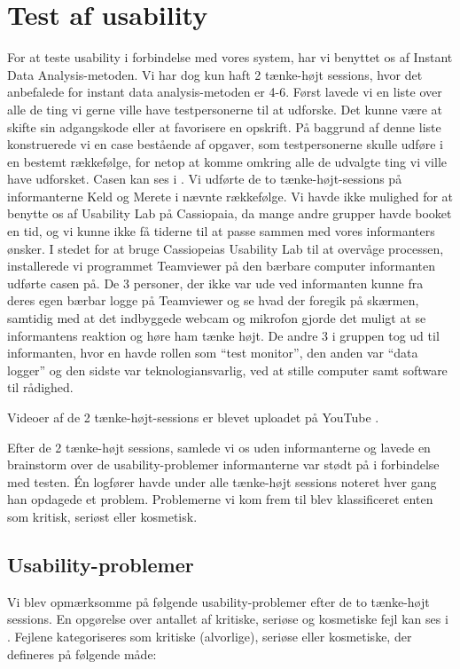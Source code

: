 \section{Test af usability}
\label{sec:usability}

For at teste usability i forbindelse med vores system, har vi benyttet os af Instant Data Analysis-metoden\cite{debida}. Vi har dog kun haft 2 tænke-højt sessions, hvor det anbefalede for instant data analysis-metoden er 4-6. Først lavede vi en liste over alle de ting vi gerne ville have testpersonerne til at udforske. Det kunne \fx være at skifte sin adgangskode eller at favorisere en opskrift. På baggrund af denne liste konstruerede vi en case bestående af opgaver, som testpersonerne skulle udføre i en bestemt rækkefølge, for netop at komme omkring alle de udvalgte ting vi ville have udforsket. Casen kan ses i . Vi udførte de to tænke-højt-sessions på informanterne Keld og Merete i nævnte rækkefølge. Vi havde ikke mulighed for at benytte os af Usability Lab på Cassiopaia, da mange andre grupper havde booket en tid, og vi kunne ikke få tiderne til at passe sammen med vores informanters ønsker. I stedet for at bruge Cassiopeias Usability Lab til at overvåge processen, installerede vi programmet Teamviewer på den bærbare computer informanten udførte casen på. De 3 personer, der ikke var ude ved informanten kunne fra deres egen bærbar logge på Teamviewer og se hvad der foregik på skærmen, samtidig med at det indbyggede webcam og mikrofon gjorde det muligt at se informantens reaktion og høre ham tænke højt. De andre 3 i gruppen tog ud til informanten, hvor en havde rollen som ``test monitor'', den anden var ``data logger'' og den sidste var teknologiansvarlig, ved at stille computer samt software til rådighed.

Videoer af de 2 tænke-højt-sessions er blevet uploadet på YouTube \cite{usabilitykjeld} \cite{usabilitymerete}.

Efter de 2 tænke-højt sessions, samlede vi os uden informanterne og lavede en brainstorm over de usability-problemer informanterne var stødt på i forbindelse med testen. Én logfører havde under alle tænke-højt sessions noteret hver gang han opdagede et problem. Problemerne vi kom frem til blev klassificeret enten som kritisk, seriøst eller kosmetisk.

\subsection{Usability-problemer}
Vi blev opmærksomme på følgende usability-problemer efter de to tænke-højt sessions. En opgørelse over antallet af kritiske, seriøse og kosmetiske fejl kan ses i . Fejlene kategoriseres som kritiske (alvorlige), seriøse eller kosmetiske, der defineres på følgende måde:

